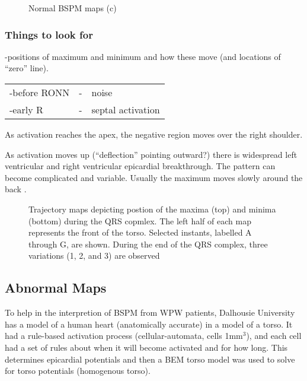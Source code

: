 \begin{figure}[htbp] \centering
 \caption[Normal BSPM maps (c)]{Normal BSPM maps (c) }
  \label{fig:hal-bspm-normalc}
\end{figure}


\subsubsection{Things to look for}
-positions of maximum and minimum and how these move (and locations of
``zero'' line).
 
\begin{tabular}{lcl}
-before RONN  & - & noise\\
-early R & - & septal activation
\end{tabular}

As activation reaches the apex, the negative region moves over the right
shoulder.

As activation moves up (``deflection'' pointing outward?) there is widespread
left ventricular and right ventricular epicardial breakthrough.  The pattern
can become complicated and variable.  Usually the maximum moves slowly around
the back .

\begin{figure}[htbp] \centering
  \caption[BSPM max-min trajectories]{Trajectory maps depicting postion of the
    maxima (top) and minima (bottom) during the QRS copmlex.  The left half of
    each map represents the front of the torso.  Selected instants, labelled
    A through G, are shown.  During the end of the QRS complex, three
    variations (1, 2, and 3) are observed}
  \label{fig:bspm-max-min}
\end{figure}


\subsection{Abnormal Maps}
To help in the interpretion of BSPM from WPW patients, Dalhousie University
 has a model of a human heart (anatomically accurate) in a
model of a torso.  It had a rule-based activation process (cellular-automata,
cells 1mm$^{3}$), and each cell had a set of rules about when it will become
activated and for how long.   This determines epicardial potentials and then
a BEM torso model was used to solve for torso potentials (homogenous torso).

